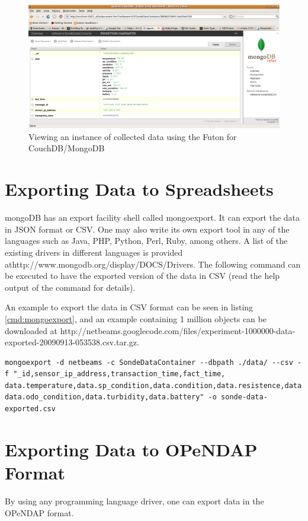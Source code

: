\begin{figure}[h]
  \centering
  \includegraphics[scale=0.3]{../diagrams/view-collected-data-instance-browser-futondb}
  \caption{Viewing an instance of collected data using the Futon for
  CouchDB/MongoDB}
  \label{fig:view-collected-data-instance-browser-futondb}
\end{figure}

\section{Exporting Data to Spreadsheets}

mongoDB has an export facility shell called mongoexport. It can export the data
in JSON format or CSV. One may also write its own export tool in any of the
languages such as Java, PHP, Python, Perl, Ruby, among others. A list of the
existing drivers in different languages is provided
athttp://www.mongodb.org/display/DOCS/Drivers. The following command can be
executed to have the exported version of the data in CSV (read the help output
of the command for details).

An example to export the data in CSV format can be seen in listing
\ref{cmd:mongoexport}, and an example containing 1 million objects can be
downloaded at
http://netbeams.googlecode.com/files/experiment-1000000-data-exported-20090913-053538.csv.tar.gz.

\lstset{label=cmd:mongoexport,caption=Command to export data in CSV format}
\begin{lstlisting}
mongoexport -d netbeams -c SondeDataContainer --dbpath ./data/ --csv -f "_id,sensor_ip_address,transaction_time,fact_time,
data.temperature,data.sp_condition,data.condition,data.resistence,data.salinitude,data.pressure,data.depth,data.ph,data.pH_mv,data.odo_sat,
data.odo_condition,data.turbidity,data.battery" -o sonde-data-exported.csv
\end{lstlisting}

\section{Exporting Data to OPeNDAP Format}

By using any programming language driver, one can export data in the OPeNDAP
format.